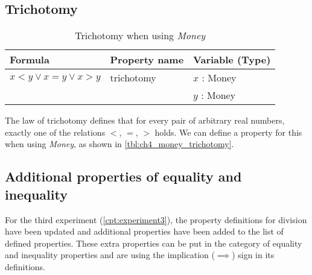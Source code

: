 \subsection*{Trichotomy}
\label{ssct:properties_trichotomy}
\begin{table}[!ht]
\centering
\begin{tabular}{lll}
\hline
                        \textbf{Formula}              & \textbf{Property name} & \textbf{Variable (Type)} \\ \hline
\rowcolor[HTML]{EFEFEF} $x < y \lor x = y \lor x > y$ & trichotomy             & $x$ : Money              \\
\rowcolor[HTML]{EFEFEF}                               &                        & $y$ : Money              \\ \hline
\end{tabular}
\caption{Trichotomy when using \textit{Money}}
\label{tbl:ch4_money_trichotomy}
\end{table}
\FloatBarrier\noindent
The law of trichotomy defines that for every pair of arbitrary real numbers,
exactly one of the relations \textit{$<$}, \textit{$=$}, \textit{$>$} holds. We
can define a property for this when using \textit{Money}, as shown in
\autoref{tbl:ch4_money_trichotomy}.
\clearpage %
\subsection{Additional properties of equality and inequality}
\label{ssct:properties_definitions_additionalproperties}
For the third experiment (\autoref{cpt:experiment3}), the property definitions for division have been updated and additional properties have
been added to the list of defined properties. These extra properties can be put in the category of equality and
inequality properties and are using the implication ($\implies$) sign in its
definitions.

